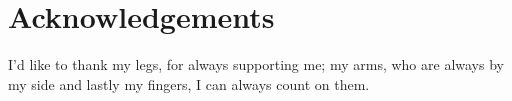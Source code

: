 \chapter*{Acknowledgements}
I'd like to thank my legs, for always supporting me; my arms, who are always by my side and lastly my fingers, I can always count on them.